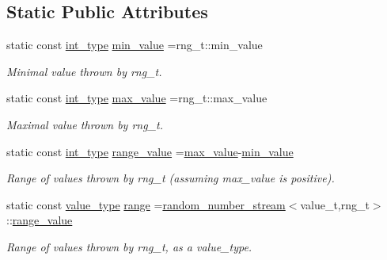 \subsection*{Static Public Attributes}
\begin{DoxyCompactItemize}
\item 
\hypertarget{a00460_a52779e1c6d29463ea54695edd61c8ba3}{static const \hyperlink{a00460_aaea501ae2db60d08b10b98b3cf499f37}{int\-\_\-type} \hyperlink{a00460_a52779e1c6d29463ea54695edd61c8ba3}{min\-\_\-value} =rng\-\_\-t\-::min\-\_\-value}\label{a00460_a52779e1c6d29463ea54695edd61c8ba3}

\begin{DoxyCompactList}\small\item\em Minimal value thrown by rng\-\_\-t. \end{DoxyCompactList}\item 
\hypertarget{a00460_ada49cf2023194ff542387f01032f7116}{static const \hyperlink{a00460_aaea501ae2db60d08b10b98b3cf499f37}{int\-\_\-type} \hyperlink{a00460_ada49cf2023194ff542387f01032f7116}{max\-\_\-value} =rng\-\_\-t\-::max\-\_\-value}\label{a00460_ada49cf2023194ff542387f01032f7116}

\begin{DoxyCompactList}\small\item\em Maximal value thrown by rng\-\_\-t. \end{DoxyCompactList}\item 
\hypertarget{a00460_a62cfe3c49122f089f839869ee502f6a9}{static const \hyperlink{a00460_aaea501ae2db60d08b10b98b3cf499f37}{int\-\_\-type} \hyperlink{a00460_a62cfe3c49122f089f839869ee502f6a9}{range\-\_\-value} =\hyperlink{a00460_ada49cf2023194ff542387f01032f7116}{max\-\_\-value}-\/\hyperlink{a00460_a52779e1c6d29463ea54695edd61c8ba3}{min\-\_\-value}}\label{a00460_a62cfe3c49122f089f839869ee502f6a9}

\begin{DoxyCompactList}\small\item\em Range of values thrown by rng\-\_\-t (assuming max\-\_\-value is positive). \end{DoxyCompactList}\item 
\hypertarget{a00460_a11eb62d9f8ec484e79a125f440c78cf7}{static const \hyperlink{a00460_a9294408b4bf4d469d2cb1682e10225a8}{value\-\_\-type} \hyperlink{a00460_a11eb62d9f8ec484e79a125f440c78cf7}{range} =\hyperlink{a00460}{random\-\_\-number\-\_\-stream}$<$value\-\_\-t,rng\-\_\-t$>$\-::\hyperlink{a00460_a62cfe3c49122f089f839869ee502f6a9}{range\-\_\-value}}\label{a00460_a11eb62d9f8ec484e79a125f440c78cf7}

\begin{DoxyCompactList}\small\item\em Range of values thrown by rng\-\_\-t, as a value\-\_\-type. \end{DoxyCompactList}\end{DoxyCompactItemize}


